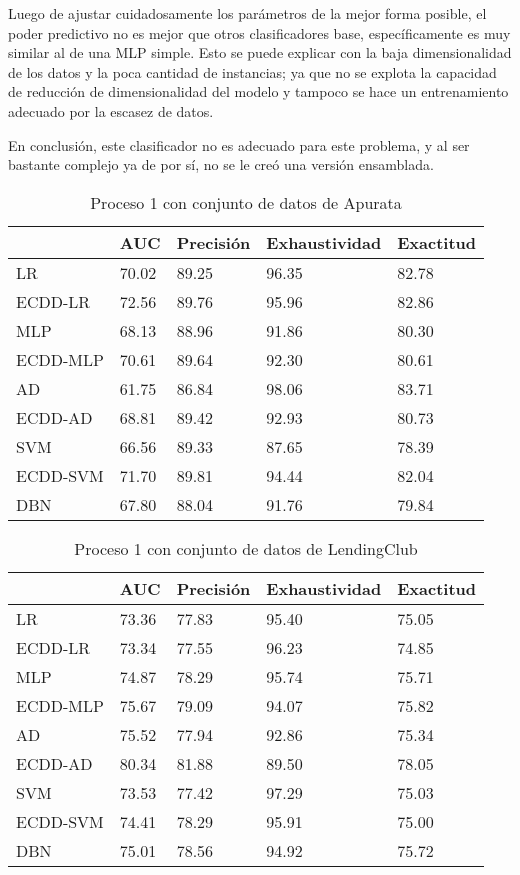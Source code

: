 Luego de ajustar cuidadosamente los parámetros de la mejor forma posible, el poder predictivo no es mejor que otros clasificadores base, específicamente es muy similar al de una \ac{MLP} simple. Esto se puede explicar con la baja dimensionalidad de los datos y la poca cantidad de instancias; ya que no se explota la capacidad de reducción de dimensionalidad del modelo y tampoco se hace un entrenamiento adecuado por la escasez de datos.

En conclusión, este clasificador no es adecuado para este problema, y al ser bastante complejo ya de por sí, no se le creó una versión ensamblada.


\begin{table}[]
\centering
\caption{Proceso 1 con conjunto de datos de Apurata}
\label{tab:apurata-proc1}
\begin{tabularx}{0.75\textwidth}{|l|Y Y Y Y|}
				\hline
				& AUC	   & Precisión & Exhaustividad	& Exactitud  \\
				\hline
LR			  & 70.02	 & 89.25	 & 96.35	 & 82.78	 \\
ECDD-LR		   & 72.56	 & 89.76	 & 95.96	 & 82.86	 \\
				\hline
MLP			 & 68.13	 & 88.96	 & 91.86	 & 80.30	 \\
ECDD-MLP		  & 70.61	 & 89.64	 & 92.30	 & 80.61	 \\
				\hline
AD			  & 61.75	 & 86.84	 & 98.06	 & 83.71	 \\
ECDD-AD		   & 68.81	 & 89.42	 & 92.93	 & 80.73	 \\
				\hline
SVM			 & 66.56	 & 89.33	 & 87.65	 & 78.39	 \\
ECDD-SVM		  & 71.70	 & 89.81	 & 94.44	 & 82.04	 \\
				\hline
DBN			 & 67.80	 & 88.04	 & 91.76	 & 79.84	 \\
				\hline
\end{tabularx}
\end{table}


\begin{table}[]
\centering
\caption{Proceso 1 con conjunto de datos de LendingClub}
\label{tab:lc-proc1}
\begin{tabularx}{0.75\textwidth}{|l|Y Y Y Y|}
				\hline
				& AUC	   & Precisión & Exhaustividad	& Exactitud  \\
				\hline
LR			  & 73.36	 & 77.83	 & 95.40	 & 75.05		\\
ECDD-LR		   & 73.34	 & 77.55	 & 96.23	 & 74.85		\\
				\hline
MLP			 & 74.87	 & 78.29	 & 95.74	 & 75.71		\\
ECDD-MLP		  & 75.67	 & 79.09	 & 94.07	 & 75.82		\\
				\hline
AD			  & 75.52	 & 77.94	 & 92.86	 & 75.34		\\
ECDD-AD		   & 80.34	 & 81.88	 & 89.50	 & 78.05		\\
				\hline
SVM			 & 73.53	 & 77.42	 & 97.29	 & 75.03		\\
ECDD-SVM		  & 74.41	 & 78.29	 & 95.91	 & 75.00		\\
				\hline
DBN			 & 75.01	 & 78.56	 & 94.92	 & 75.72		\\
				\hline
\end{tabularx}
\end{table}


